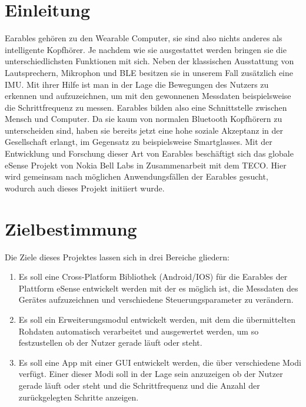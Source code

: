 \documentclass[a4paper,12pt]{article}
\title{\projektName}
\date{\today}
\begin{document}
 \setcounter{page}{2}
 \tableofcontents          %
 \clearpage

\section{Einleitung}
\Gls{Earables} gehören zu den \Gls{Wearable Computer}, sie sind also nichts anderes als intelligente Kopfhörer. Je nachdem wie sie ausgestattet werden bringen sie die unterschiedlichsten Funktionen mit sich. Neben der klassischen Ausstattung von Lautsprechern, Mikrophon und \gls{BLE} besitzen sie in unserem Fall zusätzlich eine \Gls{IMU}. Mit ihrer Hilfe ist man in der Lage die Bewegungen des Nutzers zu erkennen und aufzuzeichnen, um mit den gewonnenen Messdaten  beispielsweise die \Gls{Schrittfrequenz} zu messen.  \Gls{Earables} bilden also eine Schnittstelle zwischen Mensch und Computer. Da sie kaum von normalen Bluetooth Kopfhörern zu unterscheiden sind, haben sie bereits jetzt eine hohe soziale Akzeptanz in der Gesellschaft erlangt, im Gegensatz zu beispielsweise Smartglasses. Mit der Entwicklung und Forschung dieser Art von \Gls{Earables} beschäftigt sich das globale eSense Projekt von Nokia Bell Labs in Zusammenarbeit mit dem TECO. Hier wird gemeinsam nach möglichen Anwendungsfällen der \Gls{Earables} gesucht, wodurch auch dieses Projekt initiiert wurde.
\section{Zielbestimmung}
Die Ziele dieses Projektes lassen sich in drei Bereiche gliedern:
\begin{enumerate}

  \item Es soll eine \Gls{Cross-Platform Bibliothek} (Android/IOS) für die \Gls{Earables} der Plattform eSense entwickelt werden mit der es möglich ist, die Messdaten des Gerätes aufzuzeichnen und verschiedene \Gls{Steuerungsparameter} zu verändern.
  
  \item Es soll ein Erweiterungsmodul entwickelt werden, mit dem die übermittelten  \Gls{Rohdaten} automatisch verarbeitet und ausgewertet werden, um so festzustellen ob der Nutzer gerade läuft oder steht.
  
  \item Es soll eine App mit einer \Gls{GUI} entwickelt werden, die über verschiedene Modi verfügt. Einer dieser Modi soll in der Lage sein anzuzeigen ob der Nutzer gerade läuft oder steht und die \gls{Schrittfrequenz} und die Anzahl der zurückgelegten Schritte anzeigen.

\end{enumerate}
\end{document}
